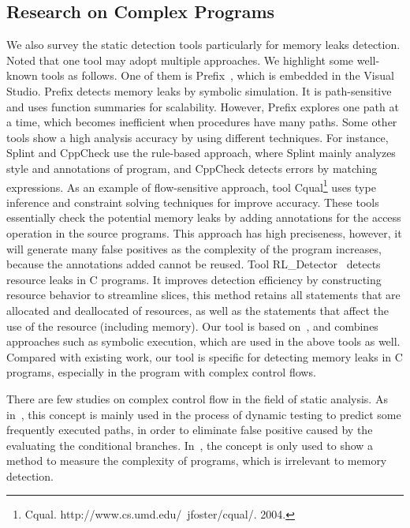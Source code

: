 \subsection{Research on Complex Programs}
We also survey the static detection tools particularly for memory leaks detection. Noted that one tool may adopt multiple approaches. We highlight some well-known tools as follows. One of them is Prefix~\cite{BPS00}, which is embedded in the Visual Studio. Prefix detects memory leaks by symbolic simulation. It is path-sensitive and uses function summaries for scalability. However, Prefix explores one path at a time, which becomes inefficient when procedures have many paths. %
Some other tools show a high analysis accuracy by using different techniques. For instance, Splint and CppCheck use the rule-based approach, where Splint mainly analyzes style and annotations of program, and CppCheck detects errors by matching expressions. As an example of flow-sensitive approach, tool Cqual\footnote{Cqual. http://www.cs.umd.edu/~jfoster/cqual/. 2004.} uses type inference and constraint solving techniques for improve accuracy. These tools essentially check the potential memory leaks by adding annotations for the access operation in the source programs. This approach has high preciseness, however, it will generate many false positives as the complexity of the program increases, because the annotations added cannot be reused. Tool RL\_Detector~\cite{J14} detects resource leaks in C programs. It improves detection efficiency by constructing resource behavior to streamline slices, this method retains all statements that are allocated and deallocated of resources, as well as the statements that affect the use of the resource (including memory). Our tool is based on~\cite{XA05,YZ04}, and combines approaches such as symbolic execution, which are used in the above tools as well. Compared with existing work, our tool is specific for detecting memory leaks in C programs, especially in the program with complex control flows. 

There are few studies on complex control flow in the field of static analysis. As in~\cite{KJMP06}, this concept is mainly used in the process of dynamic testing to predict some frequently executed paths, in order to eliminate false positive caused by the evaluating the conditional branches. In~\cite{KK12}, the concept is only used to show a method to measure the complexity of programs, which is irrelevant to memory detection. %

